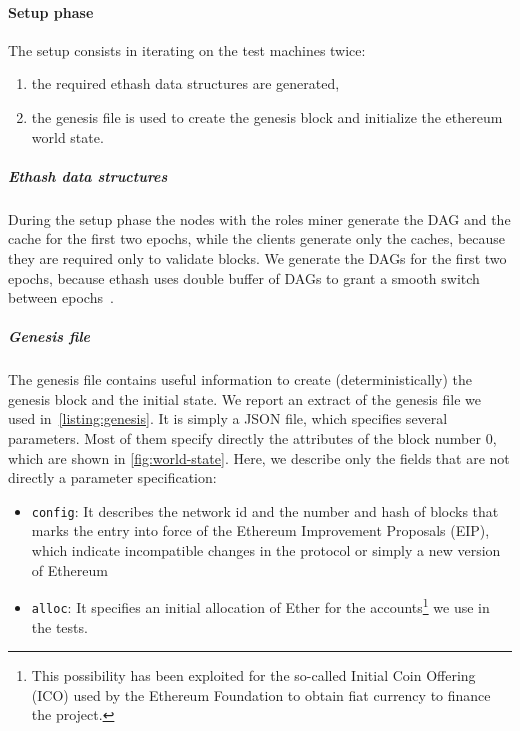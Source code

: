 \paragraph{Setup phase}
The setup consists in iterating on the test machines twice:
\begin{enumerate}
  \item the required ethash data structures are generated,
  \item the genesis file is used to create the genesis block and initialize the
  ethereum  world state.
\end{enumerate}


\subparagraph{Ethash data structures}
During the setup phase the nodes with the roles miner generate the DAG and the
cache for the first two epochs, while the clients generate only the caches,
because they are required only to validate blocks. We generate the DAGs for the
first two epochs, because ethash uses double buffer of DAGs to grant a smooth
switch between epochs~\cite{bib:dagger-hashimoto}.

\subparagraph{Genesis file}
The genesis file contains useful information to create (deterministically) the
genesis block and the initial state. We report an extract of the genesis file we
used in~\autoref{listing:genesis}. It is simply a JSON file, which specifies
several parameters. Most of them specify directly the attributes of the block
number $0$, which are shown in \autoref{fig:world-state}. Here, we describe only
the fields that are not directly a parameter specification:
\begin{itemize}
  \item \texttt{config}: It describes the network id and the number and hash
  of blocks that marks the entry into force of the Ethereum Improvement
  Proposals (EIP), which indicate incompatible changes in the protocol or
  simply a new version of Ethereum
  \item \texttt{alloc}: It specifies an initial allocation of Ether for the
  accounts\footnote{This possibility has been exploited for the so-called
  Initial Coin Offering (ICO) used by the Ethereum Foundation to obtain fiat
  currency to finance the project.} we use in the tests.
\end{itemize}

\begin{figure}[h!]
  
\end{figure}

